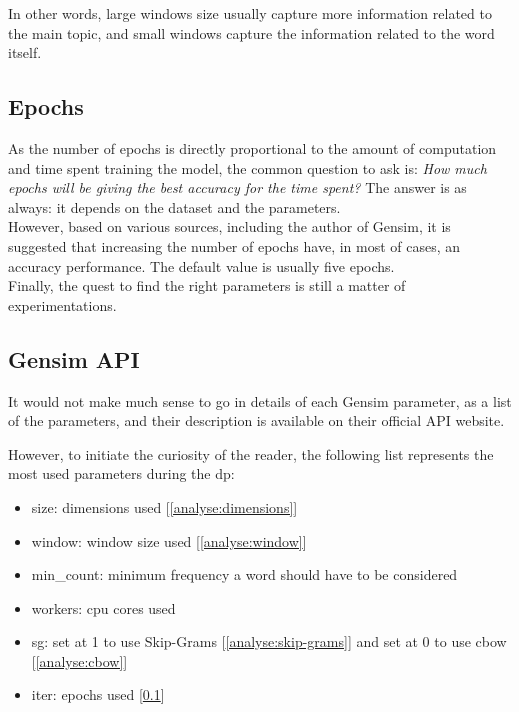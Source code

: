 In other words, large windows size usually capture more information related to the main topic, and small windows capture the information related to the word itself.


\subsection{Epochs}
\label{analyse:epochs}
As the number of epochs is directly proportional to the amount of computation and time spent training the model, the common question to ask is: \textit{How much epochs will be giving the best accuracy for the time spent?} The answer is as always: it depends on the dataset and the parameters. \\

However, based on various sources, including the author of Gensim\cite{article:word2vec-epochs}, it is suggested that increasing the number of epochs have, in most of cases, an accuracy performance. The default value is usually five epochs.\\

Finally, the quest to find the right parameters is still a matter of experimentations.


\subsection{Gensim API}
It would not make much sense to go in details of each Gensim parameter, as a list of the parameters, and their description is available on their official API website\cite{article:gensim-api}.

However, to initiate the curiosity of the reader, the following list represents the most used parameters during the \gls{dp}:

\begin{itemize}
    \setlength\itemsep{0em}
    \item size: dimensions used [\ref{analyse:dimensions}]
    \item window: window size used [\ref{analyse:window}]
    \item min\_count: minimum frequency a word should have to be considered
    \item workers: cpu cores used
    \item sg: set at 1 to use Skip-Grams [\ref{analyse:skip-grams}] and set at 0 to use \gls{cbow} [\ref{analyse:cbow}]
    \item iter: epochs used [\ref{analyse:epochs}]
\end{itemize}


